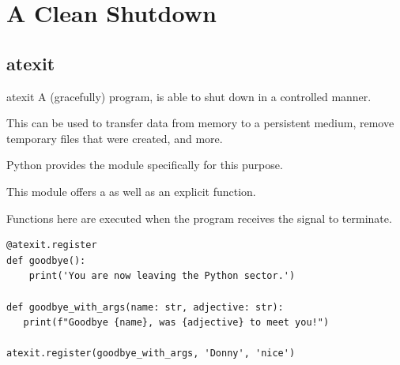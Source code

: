\documentclass[12pt, aspectratio=169, usepdftitle=false]{beamer}
\newcommand{\pp}[1]{\lpl{#1}}
\begin{document}

\section{A Clean Shutdown}
\subsection{atexit}
\begin{frame}[fragile]{atexit}
        A (gracefully)  program, is able to shut down in a controlled manner.

		\medskip
		
		This  can be used to transfer data from memory to a persistent medium, remove temporary files that were created, and more.
		
		\medskip
		
		Python provides the \pp{atexit} module specifically for this purpose.
		
		\medskip
		
		This module offers a  as well as an explicit \pp{register} function.
		
		\medskip
		
		Functions  here are executed when the program receives the signal to terminate.
		
		\medskip


 \begin{lstlisting}[language=pytiny]
@atexit.register
def goodbye():
    print('You are now leaving the Python sector.')	

def goodbye_with_args(name: str, adjective: str):
   print(f"Goodbye {name}, was {adjective} to meet you!")

atexit.register(goodbye_with_args, 'Donny', 'nice')
	\end{lstlisting}
\end{frame}




	
	
\end{document}
